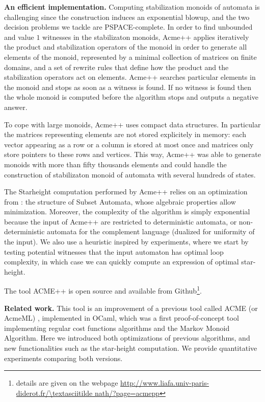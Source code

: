 \textbf{An efficient implementation.} Computing stabilization monoids of automata is challenging since the construction induces an exponential blowup, and the two decision problems we tackle are PSPACE-complete. In order to find unbounded and value $1$ witnesses in the stabilizaton monoids, Acme++
%
applies iteratively the product and stabilization operators of the monoid in order to generate all elements of the monoid, represented by a minimal collection of matrices on finite domains, and a set of rewrite rules that define how the product and the stabilization operators act on elements.
Acme++ searches particular elements in the monoid and stops as soon as a witness is found. If no witness is found then the whole monoid is computed before the algorithm stops and outputs a negative answer.

To cope with large monoids, Acme++ uses compact data structures. In particular the matrices representing elements are not stored explicitely in memory: each vector appearing as a row or a column is stored at most once and matrices only store pointers to these rows and vertices. This way, Acme++ was able to generate monoids with more than fifty thousands elements and could handle the construction of stabilizaton monoid of automata with several hundreds of states.

The Starheight computation performed by Acme++ relies on an optimization from \cite{CL08sh}: the structure of Subset Automata, whose algebraic properties allow minimization. Moreover, the complexity of the algorithm is simply exponential because the input of Acme++ are restricted to deterministic automata, or non-deterministic automata for the complement language (dualized for uniformity of the input). We also use a heuristic inspired by experiments, where we start by testing potential witnesses that the input automaton has optimal loop complexity, in which case we can quickly compute an expression of optimal star-height.

The tool ACME++ is open source and available from Github\footnote{details are given on the webpage
\url{http://www.liafa.univ-paris-diderot.fr/\textasciitilde nath/?page=acmepp}}.

\textbf{Related work.}
This tool is an improvement of a previous tool called ACME (or AcmeML) \cite{FK14}, implemented in OCaml, which was a first proof-of-concept tool implementing regular cost functions algorithms and the Markov Monoid Algorithm.
Here we introduced both optimizations of previous algorithms, and new functionalities such as the star-height computation. We provide quantitative experiments comparing both versions.




